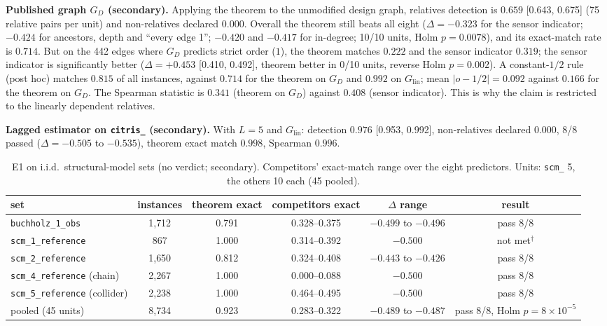 \textbf{Published graph $G_D$ (secondary).} Applying the theorem to the unmodified design graph, relatives detection is $0.659$ [0.643, 0.675] (75 relative pairs per unit) and non-relatives declared $0.000$.
Overall the theorem still beats all eight ($\Delta=-0.323$ for the sensor indicator; $-0.424$ for ancestors, depth and ``every edge 1''; $-0.420$ and $-0.417$ for in-degree; 10/10 units, Holm $p=0.0078$), and its exact-match rate is $0.714$.
But on the 442 edges where $G_D$ predicts strict order ($1$), the theorem matches $0.222$ and the sensor indicator $0.319$; the sensor indicator is significantly better
($\Delta=+0.453$ [0.410, 0.492], theorem better in 0/10 units, reverse Holm $p=0.002$). A constant-$1/2$ rule (post hoc) matches $0.815$ of all instances, against $0.714$ for the theorem on $G_D$ and $0.992$ on $G_{\mathrm{lin}}$;
mean $|o-1/2|=0.092$ against $0.166$ for the theorem on $G_D$. The Spearman statistic is $0.341$ (theorem on $G_D$) against $0.408$ (sensor indicator). This is why the claim is restricted to the linearly dependent relatives.

\textbf{Lagged estimator on \texttt{citris\_} (secondary).} With $L=5$ and $G_{\mathrm{lin}}$: detection $0.976$ [0.953, 0.992], non-relatives declared $0.000$, 8/8 passed ($\Delta=-0.505$ to $-0.535$), theorem exact match $0.998$, Spearman $0.996$.

\begin{table}
\caption{E1 on i.i.d.\ structural-model sets (no verdict; secondary). Competitors' exact-match range over the eight predictors. Units: \texttt{scm\_} 5, the others 10 each (45 pooled).}
\label{tab:e1iid}
\centering
\setlength{\tabcolsep}{3pt}
\begin{tabular}{lccccc}
\toprule
set & instances & theorem exact & competitors exact & $\Delta$ range & result \\
\midrule
\texttt{buchholz\_1\_obs} & 1{,}712 & 0.791 & 0.328--0.375 & $-0.499$ to $-0.496$ & pass 8/8 \\
\texttt{scm\_1\_reference} & 867 & 1.000 & 0.314--0.392 & $-0.500$ & not met$^\dagger$ \\
\texttt{scm\_2\_reference} & 1{,}650 & 0.812 & 0.324--0.408 & $-0.443$ to $-0.426$ & pass 8/8 \\
\texttt{scm\_4\_reference} (chain) & 2{,}267 & 1.000 & 0.000--0.088 & $-0.500$ & pass 8/8 \\
\texttt{scm\_5\_reference} (collider) & 2{,}238 & 1.000 & 0.464--0.495 & $-0.500$ & pass 8/8 \\
pooled (45 units) & 8{,}734 & 0.923 & 0.283--0.322 & $-0.489$ to $-0.487$ & pass 8/8, Holm $p=8\times10^{-5}$ \\
\bottomrule
\end{tabular}
\par{}
\end{table}

